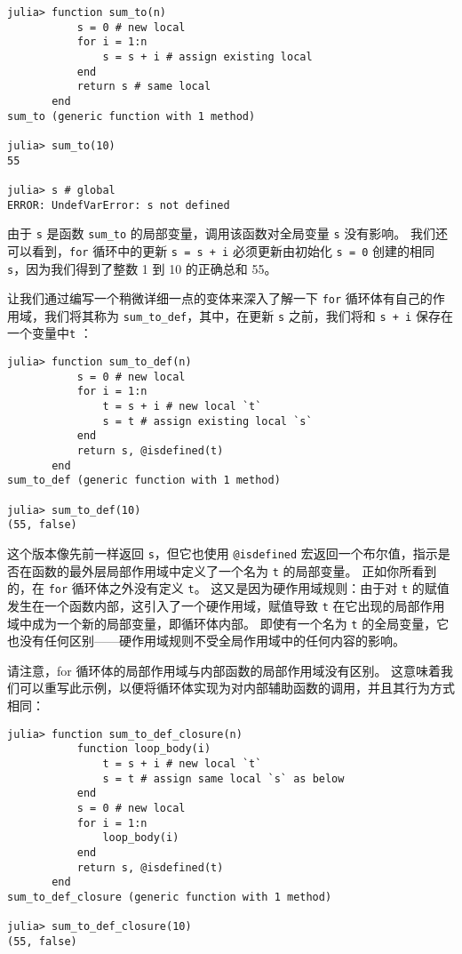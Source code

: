 \begin{verbatim}
julia> function sum_to(n)
           s = 0 # new local
           for i = 1:n
               s = s + i # assign existing local
           end
           return s # same local
       end
sum_to (generic function with 1 method)

julia> sum_to(10)
55

julia> s # global
ERROR: UndefVarError: s not defined
\end{verbatim}



由于 \texttt{s} 是函数 \texttt{sum\_to} 的局部变量，调用该函数对全局变量 \texttt{s} 没有影响。 我们还可以看到，\texttt{for} 循环中的更新 \texttt{s = s + i} 必须更新由初始化 \texttt{s = 0} 创建的相同 \texttt{s}，因为我们得到了整数 1 到 10 的正确总和 55。



让我们通过编写一个稍微详细一点的变体来深入了解一下 \texttt{for} 循环体有自己的作用域，我们将其称为 \texttt{sum\_to\_def}，其中，在更新 \texttt{s} 之前，我们将和 \texttt{s + i} 保存在一个变量中\texttt{t} ：




\begin{verbatim}
julia> function sum_to_def(n)
           s = 0 # new local
           for i = 1:n
               t = s + i # new local `t`
               s = t # assign existing local `s`
           end
           return s, @isdefined(t)
       end
sum_to_def (generic function with 1 method)

julia> sum_to_def(10)
(55, false)
\end{verbatim}



这个版本像先前一样返回 \texttt{s}，但它也使用 \texttt{@isdefined} 宏返回一个布尔值，指示是否在函数的最外层局部作用域中定义了一个名为 \texttt{t} 的局部变量。 正如你所看到的，在 \texttt{for} 循环体之外没有定义 \texttt{t}。 这又是因为硬作用域规则：由于对 \texttt{t} 的赋值发生在一个函数内部，这引入了一个硬作用域，赋值导致 \texttt{t} 在它出现的局部作用域中成为一个新的局部变量，即循环体内部。 即使有一个名为 \texttt{t} 的全局变量，它也没有任何区别——硬作用域规则不受全局作用域中的任何内容的影响。



请注意，for 循环体的局部作用域与内部函数的局部作用域没有区别。 这意味着我们可以重写此示例，以便将循环体实现为对内部辅助函数的调用，并且其行为方式相同：




\begin{verbatim}
julia> function sum_to_def_closure(n)
           function loop_body(i)
               t = s + i # new local `t`
               s = t # assign same local `s` as below
           end
           s = 0 # new local
           for i = 1:n
               loop_body(i)
           end
           return s, @isdefined(t)
       end
sum_to_def_closure (generic function with 1 method)

julia> sum_to_def_closure(10)
(55, false)
\end{verbatim}



